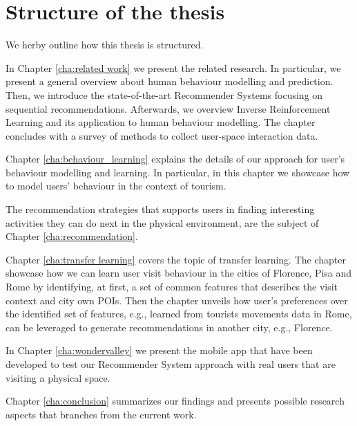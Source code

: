 \section{Structure of the thesis}
We herby outline how this thesis is structured.

In Chapter \ref{cha:related work} we present the related research. In particular, we present a general overview about human behaviour modelling and prediction. Then, we introduce the state-of-the-art Recommender Systems focusing on sequential recommendations. Afterwards, we overview Inverse Reinforcement Learning and its application to human behaviour modelling. The chapter concludes with a survey of methods to collect user-space interaction data.

Chapter \ref{cha:behaviour_learning} explains the details of our approach for user's behaviour modelling and learning. In particular, in this chapter we showcase how to model users' behaviour in the context of tourism.

The recommendation strategies that supports users in finding interesting activities they can do next in the physical environment, are the subject of Chapter \ref{cha:recommendation}.

Chapter \ref{cha:transfer learning} covers the topic of transfer learning. The chapter showcase how we can learn user visit behaviour in the cities of Florence, Pisa and Rome by identifying, at first, a set of common features that describes the visit context and city own POIs. Then the chapter unveils how user's preferences over the identified set of features, e.g., learned from tourists movements data in Rome, can be leveraged to generate recommendations in another city, e.g., Florence. 

In Chapter \ref{cha:wondervalley} we present the mobile app that have been developed to test our Recommender System approach with real users that are visiting a physical space.

Chapter \ref{cha:conclusion} summarizes our findings and presents possible research aspects that branches from the current work.

